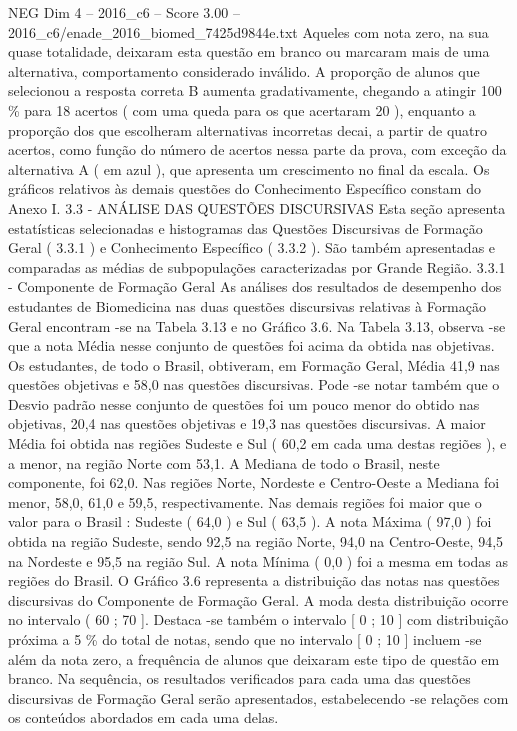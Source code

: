 \begin{textsample}{NEG Dim 4 – 2016\_c6 – Score 3.00 – 2016\_c6/enade\_2016\_biomed\_7425d9844e.txt}
Aqueles com nota zero, na sua quase totalidade, deixaram esta questão em branco ou marcaram mais de uma alternativa, comportamento considerado inválido.
A proporção de alunos que selecionou a resposta correta B aumenta gradativamente, chegando a atingir 100 \% para 18 acertos ( com uma queda para os que acertaram 20 ), enquanto a proporção dos que escolheram alternativas incorretas decai, a partir de quatro acertos, como função do número de acertos nessa parte da prova, com exceção da alternativa A ( em azul ), que apresenta um crescimento no final da escala.
Os gráficos relativos às demais questões do Conhecimento Específico constam do Anexo I. 3.3 - ANÁLISE DAS QUESTÕES DISCURSIVAS Esta seção apresenta estatísticas selecionadas e histogramas das Questões Discursivas de Formação Geral ( 3.3.1 ) e Conhecimento Específico ( 3.3.2 ).
São também apresentadas e comparadas as médias de subpopulações caracterizadas por Grande Região. 3.3.1 - Componente de Formação Geral As análises dos resultados de desempenho dos estudantes de Biomedicina nas duas questões discursivas relativas à Formação Geral encontram -se na Tabela 3.13 e no Gráfico 3.6.
Na Tabela 3.13, observa -se que a nota Média nesse conjunto de questões foi acima da obtida nas objetivas.
Os estudantes, de todo o Brasil, obtiveram, em Formação Geral, Média 41,9 nas questões objetivas e 58,0 nas questões discursivas.
Pode -se notar também que o Desvio padrão nesse conjunto de questões foi um pouco menor do obtido nas objetivas, 20,4 nas questões objetivas e 19,3 nas questões discursivas.
A maior Média foi obtida nas regiões Sudeste e Sul ( 60,2 em cada uma destas regiões ), e a menor, na região Norte com 53,1.
A Mediana de todo o Brasil, neste componente, foi 62,0.
Nas regiões Norte, Nordeste e Centro-Oeste a Mediana foi menor, 58,0, 61,0 e 59,5, respectivamente.
Nas demais regiões foi maior que o valor para o Brasil : Sudeste ( 64,0 ) e Sul ( 63,5 ).
A nota Máxima ( 97,0 ) foi obtida na região Sudeste, sendo 92,5 na região Norte, 94,0 na Centro-Oeste, 94,5 na Nordeste e 95,5 na região Sul.
A nota Mínima ( 0,0 ) foi a mesma em todas as regiões do Brasil.
O Gráfico 3.6 representa a distribuição das notas nas questões discursivas do Componente de Formação Geral.
A moda desta distribuição ocorre no intervalo ( 60 ; 70 ].
Destaca -se também o intervalo [ 0 ; 10 ] com distribuição próxima a 5 \% do total de notas, sendo que no intervalo [ 0 ; 10 ] incluem -se além da nota zero, a frequência de alunos que deixaram este tipo de questão em branco.
Na sequência, os resultados verificados para cada uma das questões discursivas de Formação Geral serão apresentados, estabelecendo -se relações com os conteúdos abordados em cada uma delas.

\end{textsample}
